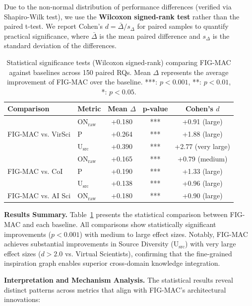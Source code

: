 \documentclass[runningheads]{llncs}
\begin{document}
Due to the non-normal distribution of performance differences (verified via Shapiro-Wilk test), we use the \textbf{Wilcoxon signed-rank test} rather than the paired t-test. We report Cohen's $d = \bar{\Delta} / s_{\Delta}$ for paired samples to quantify practical significance, where $\bar{\Delta}$ is the mean paired difference and $s_{\Delta}$ is the standard deviation of the differences.

\begin{table}[h]
\centering
\small
\begin{tabular}{llccc}
\toprule
\textbf{Comparison} & \textbf{Metric} & \textbf{Mean $\Delta$} & \textbf{p-value} & \textbf{Cohen's $d$} \\
\midrule
\multirow{3}{*}{FIG-MAC vs. VirSci} 
 & ON$_{\text{raw}}$ & +0.180 & *** & +0.91 (large) \\
 & P & +0.264 & *** & +1.88 (large) \\
 & U$_{\text{src}}$ & +0.390 & *** & +2.77 (very large) \\
\midrule
\multirow{3}{*}{FIG-MAC vs. CoI}
 & ON$_{\text{raw}}$ & +0.165 & *** & +0.79 (medium) \\
 & P & +0.190 & *** & +1.33 (large) \\
 & U$_{\text{src}}$ & +0.138 & *** & +0.96 (large) \\
\midrule
\multirow{1}{*}{FIG-MAC vs. AI Sci}
 & ON$_{\text{raw}}$ & +0.180 & *** & +0.90 (large) \\
\bottomrule
\end{tabular}
\caption{Statistical significance tests (Wilcoxon signed-rank) comparing FIG-MAC against baselines across 150 paired RQs. Mean $\Delta$ represents the average improvement of FIG-MAC over the baseline. ***: $p<0.001$, **: $p<0.01$, *: $p<0.05$.}
\label{tab:statistical_tests}
\end{table}

\textbf{Results Summary.} Table~\ref{tab:statistical_tests} presents the statistical comparison between FIG-MAC and each baseline. All comparisons show statistically significant improvements ($p < 0.001$) with medium to large effect sizes. Notably, FIG-MAC achieves substantial improvements in Source Diversity (U$_{\text{src}}$) with very large effect sizes ($d > 2.0$ vs. Virtual Scientists), confirming that the fine-grained inspiration graph enables superior cross-domain knowledge integration.

\textbf{Interpretation and Mechanism Analysis.} The statistical results reveal distinct patterns across metrics that align with FIG-MAC's architectural innovations:
\end{document}
